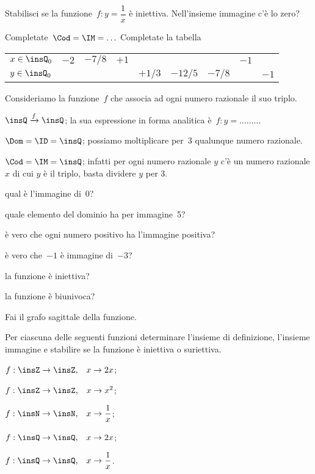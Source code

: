 \begin{esercizio}
 \label{ese:D.9}
Stabilisci se la funzione~$f:y=\dfrac{1}{x}$ è
iniettiva. Nell'insieme immagine c'è lo zero?

Completate~$\Cod = \IM =\ldots$
Completate la tabella
\begin{center}
\begin{tabular}{l*8{c}}
\toprule
$x\in \insQ_{0}$ & $-2$ & $-7/8$ & $+1$ & & & & $-1$ & \\
$y\in \insQ_{0}$ & & & & $+1/3$ & $-12/5$ & $-7/8$ & & $-1$\\
\bottomrule
\end{tabular}
\end{center}
\end{esercizio}

\begin{esercizio}
 \label{ese:D.10}
Consideriamo la funzione~$f$ che associa ad ogni numero razionale il suo triplo.

$\insQ\xrightarrow{f}\insQ$; la sua espressione in forma
analitica è~$f: y = \dots\dots\dots$

$\Dom = \ID = \insQ$; possiamo moltiplicare per~3 qualunque numero razionale.

$\Cod = \IM =\insQ$; infatti per ogni numero razionale $y$ c'è un numero razionale $x$ di cui $y$ è il triplo, basta dividere $y$ per 3.
%

\begin{enumeratea}
\item qual è l'immagine di~0?\dotfill
\item quale elemento del dominio ha per immagine~5?\dotfill
\item è vero che ogni numero positivo ha l'immagine positiva?\dotfill
\item è vero che~$-1$ è immagine di~$-3$?\dotfill
\item la funzione è iniettiva?\dotfill
\item la funzione è biunivoca?\dotfill
\end{enumeratea}
Fai il grafo sagittale della funzione.
\end{esercizio}

\begin{esercizio}
 \label{ese:D.11}
Per ciascuna delle seguenti funzioni determinare l'insieme di definizione, l'insieme
immagine e stabilire se la funzione è iniettiva o suriettiva.

\begin{enumeratea}
\item $f:\insZ\rightarrow\insZ\text{,}\quad x\rightarrow 2x$;
\item $f:\insZ\rightarrow\insZ\text{,}\quad x\rightarrow x^{2}$;
\item $f:\insN\rightarrow\insN\text{,}\quad x\rightarrow \dfrac{1}{x}$;
\item $f:\insQ\rightarrow\insQ\text{,}\quad x\rightarrow 2x$;
\item $f:\insQ\rightarrow\insQ\text{,}\quad x\rightarrow \dfrac{1}{x}$.
\end{enumeratea}
\end{esercizio}

